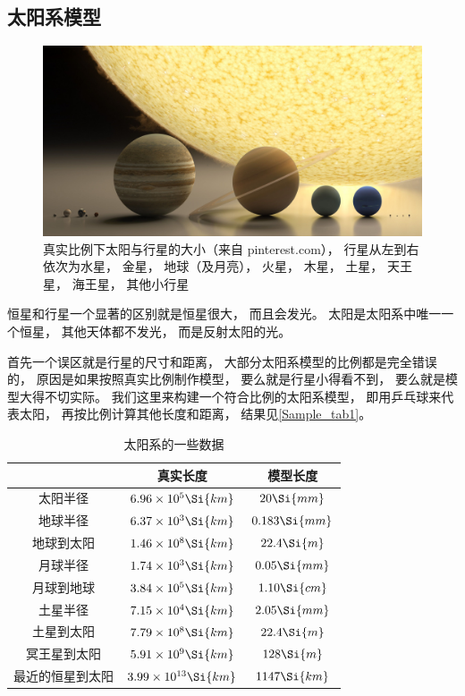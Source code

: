 
\subsection{太阳系模型}

\begin{figure}[ht]
\centering
\includegraphics[width=14cm]{./figures/Astro1.pdf}
\caption{真实比例下太阳与行星的大小（来自 pinterest.com）， 行星从左到右依次为水星， 金星， 地球（及月亮）， 火星， 木星， 土星， 天王星， 海王星， 其他小行星} \label{Astro_fig1}
\end{figure}

恒星和行星一个显著的区别就是恒星很大， 而且会发光。 太阳是太阳系中唯一一个恒星， 其他天体都不发光， 而是反射太阳的光。

首先一个误区就是行星的尺寸和距离， 大部分太阳系模型的比例都是完全错误的， 原因是如果按照真实比例制作模型， 要么就是行星小得看不到， 要么就是模型大得不切实际。 我们这里来构建一个符合比例的太阳系模型， 即用乒乓球来代表太阳， 再按比例计算其他长度和距离， 结果见\autoref{Sample_tab1}。

\begin{table}[ht]
\centering
\caption{太阳系的一些数据}\label{Sample_tab1}
\begin{tabular}{|c|c|c|}
\hline
 & 真实长度 & 模型长度 \\
\hline
太阳半径 & $6.96\times 10^5 \Si{km}$ & $20\Si{mm}$\\
\hline
地球半径 &  $6.37\times 10^3 \Si{km}$ & $0.183 \Si{mm}$\\
\hline
地球到太阳  &  $1.46 \times 10^8 \Si{km}$ & $22.4 \Si{m}$\\
\hline
月球半径 & $1.74 \times 10^3 \Si{km}$ & $0.05 \Si{mm}$\\
\hline
月球到地球 & $3.84 \times 10^5 \Si{km}$ &  $1.10 \Si{cm}$\\
\hline
土星半径 & $7.15 \times 10^4 \Si{km}$ & $2.05 \Si{mm}$\\
\hline
土星到太阳 & $7.79 \times 10^8 \Si{km}$ & $22.4 \Si{m}$\\
\hline
冥王星到太阳 & $5.91 \times 10^9 \Si{km}$ & $128 \Si{m}$\\
\hline
最近的恒星到太阳 & $3.99 \times 10^{13} \Si{km}$ &  $1147 \Si{km}$\\
\hline
\end{tabular}
\end{table}

